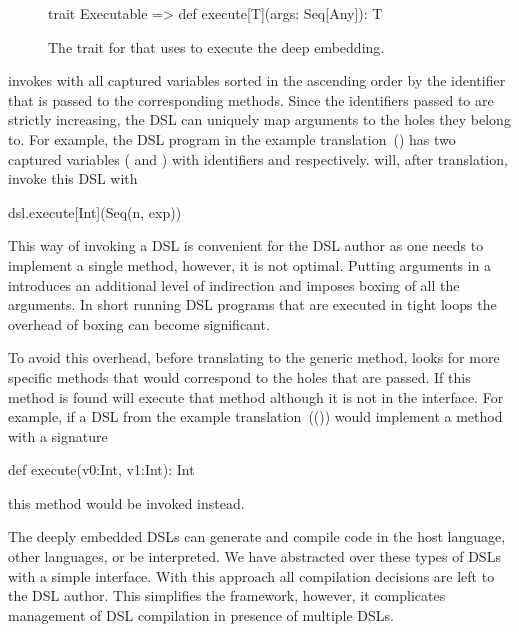 \begin{figure}
\begin{listingtiny}
trait Executable { =>
  def execute[T](args: Seq[Any]): T
}
\end{listingtiny}
\caption{The trait for that \yy uses to execute the deep embedding.}
\label{fig:executable}
\end{figure}


\yy invokes  with all captured variables sorted in the ascending order by the identifier
that is passed to the corresponding  methods. Since the identifiers passed to
 are strictly increasing, the DSL can uniquely map arguments to the holes they belong to. For example, the DSL program in the example translation~() has two captured variables ( and ) with identifiers  and  respectively.
\yy will, after translation, invoke this DSL with\begin{lstparagraph}
dsl.execute[Int](Seq(n, exp))
\end{lstparagraph}

This way of invoking a DSL is convenient for the DSL author as one needs to implement
a single method, however, it is not optimal. Putting arguments in a  introduces an
additional level of indirection and imposes boxing of all the arguments. In short
running DSL programs that are executed in tight loops the overhead of boxing can become
significant.

To avoid this overhead, before translating to the generic  method, \yy looks for
more specific methods that would correspond to the holes that are passed. If this method is found
\yy will execute that method although it is not in the interface. For example, if a DSL from the example
translation~(()) would implement a method with a signature\begin{lstparagraph}
def execute(v0:Int, v1:Int): Int
\end{lstparagraph}
this method would be invoked instead.

The deeply embedded DSLs can generate and compile code in the host language, other languages, or be interpreted. We have
abstracted over these types of DSLs with a simple interface. With this approach
all compilation decisions are left to the DSL author. This simplifies the framework, however, it
complicates management of DSL compilation in presence of multiple DSLs.

